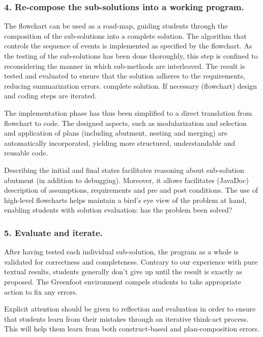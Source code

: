 \subsubsection*{4. Re-compose the sub-solutions into a working program.}

    The flowchart can be used as a road-map, guiding students through the
    composition of the sub-solutions into a complete solution.
 The algorithm that controls the sequence of
    events is implemented as specified by the flowchart. As the testing of the sub-solutions has been done
    thoroughly, this step is confined to reconsidering the manner in which sub-methods are interleaved. The
    result is tested and evaluated to ensure that the solution adheres to the requirements, reducing summarization errors.
      complete solution. If necessary (flowchart) design and coding steps are iterated.


    The implementation phase has thus been simplified to a direct translation from
    flowchart to code. The designed aspects, such as modularization and
    selection and application of plans (including abutment, nesting and merging) are
    automatically incorporated, yielding more structured, understandable and reusable code.

    Describing the initial and final states facilitates reasoning about
    sub-solution abutment (in addition to debugging). Moreover, it allows facilitates
    (JavaDoc) description of assumptions, requirements and pre and post conditions.
    The use of high-level flowcharts helps maintain a bird's eye view of the
    problem at hand, enabling students with solution evaluation: has the problem been solved?


\subsubsection*{5. Evaluate and iterate.}

    After having tested each individual sub-solution, the program as a whole is
    validated for correctness and completeness. Contrary to our experience with pure textual
    results, students generally don't give up until the result is exactly as proposed. The Greenfoot environment compels students to take appropriate action to fix any errors.

    Explicit attention should be given to reflection and evaluation in order to
    ensure that students learn from their mistakes through an iterative
    think-act process. This will help them learn from both construct-based and plan-composition
    errors.


